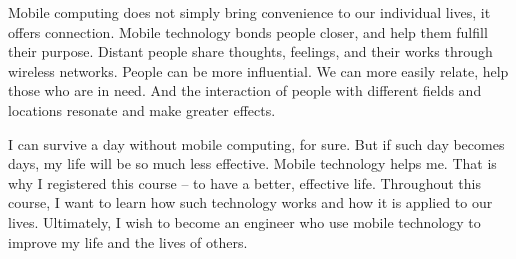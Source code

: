 \documentclass[10pt,a4paper]{article}
\begin{document}
	Mobile computing does not simply bring convenience to our individual lives, it offers connection. Mobile technology bonds people closer, and help them fulfill their purpose. Distant people share thoughts, feelings, and their works through wireless networks. People can be more influential. We can more easily relate, help those who are in need. And the interaction of people with different fields and locations resonate and make greater effects.
	
	I can survive a day without mobile computing, for sure. But if such day becomes days, my life will be so much less effective. Mobile technology helps me. That is why I registered this course – to have a better, effective life. Throughout this course, I want to learn how such technology works and how it is applied to our lives. Ultimately, I wish to become an engineer who use mobile technology to improve my life and the lives of others.
	

	
	
\end{document}
